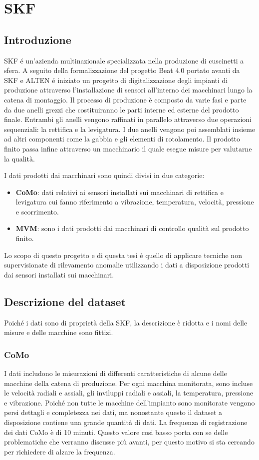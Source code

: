 \chapter{SKF}
\label{chap:skf}

\section{Introduzione}
SKF é un'azienda multinazionale specializzata nella produzione di cuscinetti a sfera. A seguito della formalizzazione del progetto Beat 4.0 portato avanti da SKF e ALTEN é iniziato un progetto di digitalizzazione degli impianti di produzione attraverso l'installazione di sensori all'interno dei macchinari lungo la catena di montaggio.
Il processo di produzione è composto da varie fasi e parte da due anelli grezzi che costituiranno le parti interne ed esterne del prodotto finale. Entrambi gli anelli vengono raffinati in parallelo attraverso due operazioni sequenziali: la rettifica e la levigatura. 
I due anelli vengono poi assemblati insieme ad altri componenti come la gabbia e gli elementi di rotolamento. Il prodotto finito passa infine attraverso un macchinario il quale esegue misure per valutarne la qualità. 

I dati prodotti dai macchinari sono quindi divisi in due categorie: 
\begin{itemize}
	\item \textbf{CoMo}: dati relativi ai sensori installati sui macchinari di rettifica e levigatura cui fanno riferimento a vibrazione, temperatura, velocità, pressione e scorrimento.
	\item \textbf{MVM}: sono i dati prodotti dai macchinari di controllo qualità sul prodotto finito.
\end{itemize}

Lo scopo di questo progetto e di questa tesi é quello di applicare tecniche non supervisionate di rilevamento anomalie utilizzando i dati a disposizione prodotti dai sensori installati sui macchinari.

\section{Descrizione del dataset}
Poiché i dati sono di proprietà della SKF, la descrizione è ridotta e i nomi delle misure e delle macchine sono fittizi.


\subsection{CoMo}
I dati includono le misurazioni di differenti caratteristiche di alcune delle macchine della catena di produzione. Per ogni macchina monitorata, sono incluse le velocità radiali e assiali, gli inviluppi radiali e assiali, la temperatura, pressione e vibrazione.
Poiché non tutte le macchine dell'impianto sono monitorate vengono persi dettagli e completezza nei dati, ma nonostante questo il dataset a disposizione contiene una grande quantità di dati.
La frequenza di registrazione dei dati CoMo è di 10 minuti. Questo valore cosi basso porta con se delle problematiche che verranno discusse più avanti, per questo motivo si sta cercando per richiedere di alzare la frequenza.


